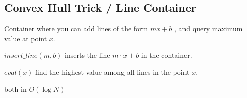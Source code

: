 \subsection{Convex Hull Trick / Line Container}

Container where you can add lines of the form $mx + b$ , and query maximum value at point $x$.

$insert\_line(m, b)$ inserts the line $m \cdot x + b$ in the container.

$eval(x)$ find the highest value among all lines in the point $x$.

both in $O(\log{N})$


